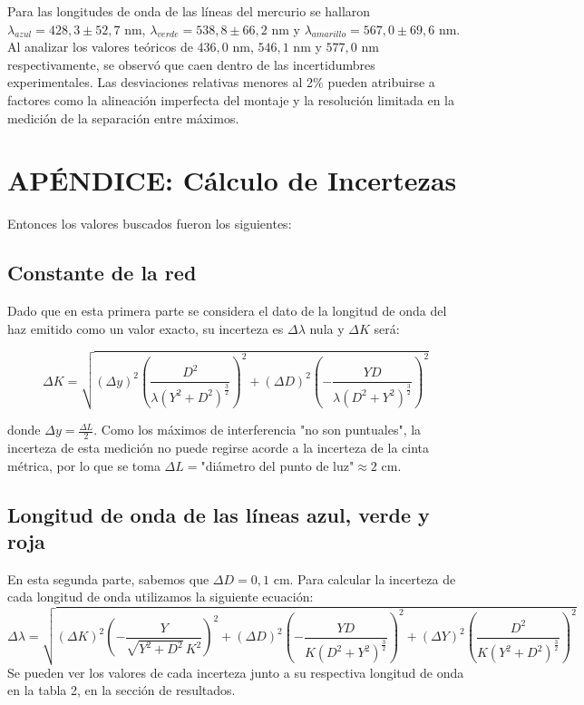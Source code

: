 \documentclass[12pt, a4paper]{article}
\begin{document}
Para las longitudes de onda de las líneas del mercurio se hallaron $\lambda_{azul} = 428,3 \pm 52,7$ nm, 
$\lambda_{verde} = 538,8 \pm 66,2$ nm y $\lambda_{amarillo} = 567,0 \pm 69,6$ nm. Al analizar los valores teóricos de $436,0$ nm, $546,1$ nm 
y $577,0$ nm respectivamente, se observó que caen dentro de las incertidumbres experimentales. Las desviaciones relativas menores al 2\% 
pueden atribuirse a factores como la alineación imperfecta del montaje y la resolución limitada en la medición de la separación entre máximos.


\section{APÉNDICE: Cálculo de Incertezas}
Entonces los valores buscados fueron los siguientes:

\subsection{Constante de la red}
Dado que en esta primera parte se considera el dato de la longitud de onda del haz emitido como un valor exacto, su incerteza es 
$\Delta \lambda$ nula y ${\Delta}K$ será:

\begin{equation}
  {\Delta}K = \sqrt{({\Delta}y)^2(\frac{D^{2}}{{\lambda} \left(Y^{2} + D^{2}\right)^{\frac{3}{2}}})^2+({\Delta}D)^2(-\frac{YD}
  {{\lambda} \left(D^{2} + Y^{2}\right)^{\frac{3}{2}}})^2}
\label{equation3}
\end{equation}

donde $\Delta y = \frac{\Delta L}{2}$. Como los máximos de interferencia "no son puntuales", la incerteza de esta medición no puede regirse acorde a la incerteza de la cinta métrica, por lo que se toma $\Delta L = $"diámetro del punto de luz"$\approx 2$ cm.

\subsection{ Longitud de onda de las líneas azul, verde y roja}
En esta segunda parte, sabemos que $\Delta D = 0,1$ cm.
Para calcular la incerteza de cada longitud de onda utilizamos la siguiente ecuación:
\begin{equation}
  {\Delta}{\lambda} = \sqrt{({\Delta}K)^2(-\frac{Y}{\sqrt{Y^{2} + 
  D^{2}} \, K^{2}})^2 + ({\Delta}D)^2(-\frac{YD}{K \left(D^{2} + Y^{2}\right)^{\frac{3}{2}}})^2+({\Delta}Y)^2(\frac{D^{2}}{K \left(Y^{2} 
  + D^{2}\right)^{\frac{3}{2}}})^2}
\label{equation4}
\end{equation}
Se pueden ver los valores de cada incerteza junto a su respectiva longitud de onda en la tabla 2, en la sección de resultados.
\end{document}
